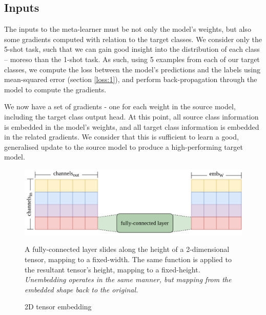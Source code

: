 \documentclass{report}
\begin{document}
\subsection{Inputs}
The inputs to the meta-learner must be not only the model's weights, but also some gradients computed with relation to the target classes. We consider only the 5-shot task, such that we can gain good insight into the distribution of each class -- moreso than the 1-shot task. As such, using 5 examples from each of our target classes, we compute the loss between the model's predictions and the labels using mean-squared error (section \ref{loss:1}), and perform back-propagation through the model to compute the gradients. \par
We now have a set of gradients - one for each weight in the source model, including the target class output head. At this point, all source class information is embedded in the model's weights, and all target class information is embedded in the related gradients. We consider that this is sufficient to learn a good, generalised update to the source model to produce a high-performing target model.

\begin{figure}[h!]
	\centering
	\includegraphics[width=12cm]{embedding}
	\caption{2D tensor embedding}
	\label{fig:embedding:1}
	A fully-connected layer slides along the height of a 2-dimensional tensor, mapping to a fixed-width. The same function is applied to the resultant tensor's height, mapping to a fixed-height. \textit{Unembedding operates in the same manner, but mapping from the embedded shape back to the original.}
\end{figure}
\end{document}
